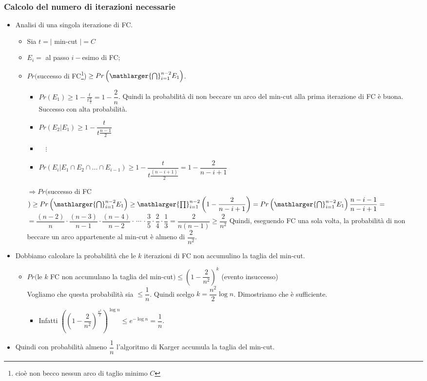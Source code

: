 \subsubsection*{Calcolo del numero di iterazioni necessarie}
\begin{itemize}
	\item Analisi di una singola iterazione di FC.\vspace{-5pt}
	\begin{itemize}
		\item Sia $t = |$ min-cut $| = C$
		\item $E_i = $ al passo $i-$esimo di FC;
		\item $Pr($successo di FC\footnote{cioè non becco nessun arco di taglio minimo $C$})$\,\geq Pr\left(\mathlarger{\bigcap}_{i=1}^{n-2} E_1\right)$.\\
		\begin{itemize}
		\item $Pr(E_1) \geq 1- \frac{t}{t\frac{n}{2}} = 1 - \dfrac{2}{n}$. Quindi la probabilità di non beccare un arco del min-cut alla prima iterazione di FC è buona. Successo con alta probabilità.
		\item $Pr(E_2|E_1) \geq 1 - \dfrac{t}{t \frac{n-1}{2}}$
		\item $\quad\vdots$
		\item $Pr(E_i|E_1\cap E_2\cap ...\cap E_{i-1}) \geq 1 - \dfrac{t}{t \frac{(n-i+1)}{2}} = 1 - \dfrac{2}{n-i+1}$
		\end{itemize}
		$\Rightarrow Pr($successo di FC$) \geq Pr\left(\mathlarger{\bigcap}_{i=1}^{n-2} E_1\right) \geq \mathlarger{\prod}_{i=1}^{n-2}\left(1 - \dfrac{2}{n-i+1}\right) = Pr\left(\mathlarger{\bigcap}_{i=1}^{n-2} E_1\right) \dfrac{n-i-1}{n-i+1} =$\eqcapo 
		$ = \dfrac{(n-2)}{n}\cdot\dfrac{(n-3)}{n-1}\cdot\dfrac{(n-4)}{n-2}\cdot\,\cdots\,\cdot\dfrac{3}{5}\cdot\dfrac{2}{4}\cdot\dfrac{1}{3} = \dfrac{2}{n(n-1)} \geq \dfrac{2}{n^2}$\eqcapo
		Quindi, eseguendo FC una sola volta, la probabilità di non beccare un arco appartenente al min-cut è almeno di $\dfrac{2}{n^2}$. 
		\end{itemize}
		\item Dobbiamo calcolare la probabilità che le $k$ iterazioni di FC non accumulino la taglia del min-cut.
	\begin{itemize}
		\item $Pr($le $k$ FC non accumulano la taglia del min-cut$) \leq \left(1 - \dfrac{2}{n^2}\right)^k$ (evento insuccesso)\\
		Vogliamo che questa probabilità sia $\leq \dfrac{1}{n}$. Quindi scelgo $k =\dfrac{n^2}{2}\log n$. Dimostriamo che è sufficiente.
		\begin{itemize}
			\item Infatti 
			$\left(\left( 1- \dfrac{2}{n^2}\right)^{\frac{n^2}{2}}\right)^{\log n} \leq e^{-\log n} = \dfrac{1}{n}$.
		\end{itemize}
	\end{itemize}
	\item Quindi con probabilità almeno $\dfrac{1}{n}$ l'algoritmo di Karger accumula la taglia del min-cut.
\end{itemize}
